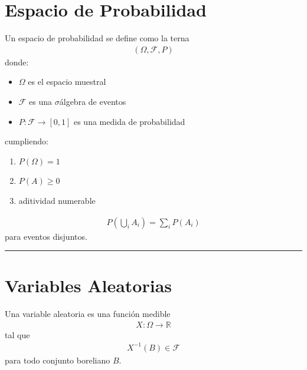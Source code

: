 \documentclass[letterpaper,10pt,english]{jupyterBook}
\begin{document}
\section{Espacio de Probabilidad}
\label{\detokenize{02_mathematical_foundations/formal_definitions:espacio-de-probabilidad}}
\sphinxAtStartPar
Un espacio de probabilidad se define como la terna
\begin{equation*}
\begin{split}
(\Omega,\mathcal{F},P)
\end{split}
\end{equation*}
\sphinxAtStartPar
donde:
\begin{itemize}
\item {} 
\sphinxAtStartPar
\(\Omega\) es el espacio muestral

\item {} 
\sphinxAtStartPar
\(\mathcal{F}\) es una \(\sigma\)\sphinxhyphen{}álgebra de eventos

\item {} 
\sphinxAtStartPar
\(P:\mathcal{F}\to[0,1]\) es una medida de probabilidad

\end{itemize}

\sphinxAtStartPar
cumpliendo:
\begin{enumerate}
%
\item {} 
\sphinxAtStartPar
\(P(\Omega)=1\)

\item {} 
\sphinxAtStartPar
\(P(A)\ge0\)

\item {} 
\sphinxAtStartPar
aditividad numerable

\end{enumerate}
\begin{equation*}
\begin{split}
P\left(\bigcup_i A_i\right)=\sum_i P(A_i)
\end{split}
\end{equation*}
\sphinxAtStartPar
para eventos disjuntos.


\bigskip\hrule\bigskip



\section{Variables Aleatorias}
\label{\detokenize{02_mathematical_foundations/formal_definitions:variables-aleatorias}}
\sphinxAtStartPar
Una variable aleatoria es una función medible
\begin{equation*}
\begin{split}
X:\Omega\rightarrow \mathbb{R}
\end{split}
\end{equation*}
\sphinxAtStartPar
tal que
\begin{equation*}
\begin{split}
X^{-1}(B)\in \mathcal{F}
\end{split}
\end{equation*}
\sphinxAtStartPar
para todo conjunto boreliano \(B\).
\end{document}
